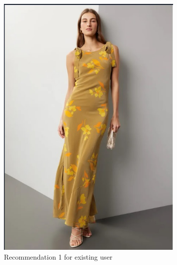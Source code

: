 \documentclass[conference]{IEEEtran}
\begin{document}
\begin{figure}[!htbp]
  \centering
  \begin{subfigure}[b]{0.4\textwidth}
    \centering
    \includegraphics[width=\textwidth]{r1.jpg}
    \caption{Recommendation 1 for existing user }
    \label{fig:Recommendations1}
  \end{subfigure}
  \hfill
  \begin{subfigure}[b]{0.4\textwidth}
    \centering

\end{subfigure}
\end{figure}
\end{document}
